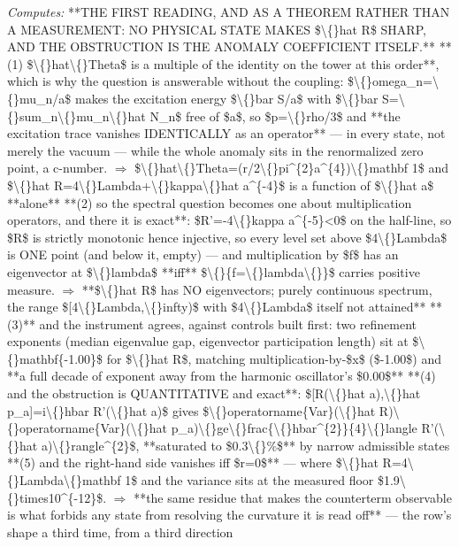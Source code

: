 \begin{description}
\emph{Computes:} **THE FIRST READING, AND AS A THEOREM RATHER THAN A MEASUREMENT: NO PHYSICAL STATE MAKES \$\textbackslash\{\}hat R\$ SHARP, AND THE OBSTRUCTION IS THE ANOMALY COEFFICIENT ITSELF.**  **(1) \$\textbackslash\{\}hat\textbackslash\{\}Theta\$ is a multiple of the identity on the tower at this order**, which is why the question is answerable without the coupling: \$\textbackslash\{\}omega\_n=\textbackslash\{\}mu\_n/a\$ makes the excitation energy \$\textbackslash\{\}bar S/a\$ with \$\textbackslash\{\}bar S=\textbackslash\{\}sum\_n\textbackslash\{\}mu\_n\textbackslash\{\}hat N\_n\$ free of \$a\$, so \$p=\textbackslash\{\}rho/3\$ and **the excitation trace vanishes IDENTICALLY as an operator** --- in every state, not merely the vacuum --- while the whole anomaly sits in the renormalized zero point, a c-number.  \ensuremath{\Rightarrow} \$\textbackslash\{\}hat\textbackslash\{\}Theta=(r/2\textbackslash\{\}pi\textasciicircum{}\{2\}a\textasciicircum{}\{4\})\textbackslash\{\}mathbf 1\$ and \$\textbackslash\{\}hat R=4\textbackslash\{\}Lambda+\textbackslash\{\}kappa\textbackslash\{\}hat a\textasciicircum{}\{-4\}\$ is a function of \$\textbackslash\{\}hat a\$ **alone**  **(2) so the spectral question becomes one about multiplication operators, and there it is exact**: \$R'=-4\textbackslash\{\}kappa a\textasciicircum{}\{-5\}<0\$ on the half-line, so \$R\$ is strictly monotonic hence injective, so every level set above \$4\textbackslash\{\}Lambda\$ is ONE point (and below it, empty) --- and multiplication by \$f\$ has an eigenvector at \$\textbackslash\{\}lambda\$ **iff** \$\textbackslash\{\}\{f=\textbackslash\{\}lambda\textbackslash\{\}\}\$ carries positive measure.  \ensuremath{\Rightarrow} **\$\textbackslash\{\}hat R\$ has NO eigenvectors; purely continuous spectrum, the range \$[4\textbackslash\{\}Lambda,\textbackslash\{\}infty)\$ with \$4\textbackslash\{\}Lambda\$ itself not attained**  **(3)** and the instrument agrees, against controls built first: two refinement exponents (median eigenvalue gap, eigenvector participation length) sit at \$\textbackslash\{\}mathbf\{-1.00\}\$ for \$\textbackslash\{\}hat R\$, matching multiplication-by-\$x\$ (\$-1.00\$) and **a full decade of exponent away from the harmonic oscillator's \$0.00\$**  **(4) and the obstruction is QUANTITATIVE and exact**: \$[R(\textbackslash\{\}hat a),\textbackslash\{\}hat p\_a]=i\textbackslash\{\}hbar R'(\textbackslash\{\}hat a)\$ gives \$\textbackslash\{\}operatorname\{Var\}(\textbackslash\{\}hat R)\textbackslash\{\}operatorname\{Var\}(\textbackslash\{\}hat p\_a)\textbackslash\{\}ge\textbackslash\{\}frac\{\textbackslash\{\}hbar\textasciicircum{}\{2\}\}\{4\}\textbackslash\{\}langle R'(\textbackslash\{\}hat a)\textbackslash\{\}rangle\textasciicircum{}\{2\}\$, **saturated to \$0.3\textbackslash\{\}\%\$** by narrow admissible states  **(5) and the right-hand side vanishes iff \$r=0\$** --- where \$\textbackslash\{\}hat R=4\textbackslash\{\}Lambda\textbackslash\{\}mathbf 1\$ and the variance sits at the measured floor \$1.9\textbackslash\{\}times10\textasciicircum{}\{-12\}\$.  \ensuremath{\Rightarrow}  **the same residue that makes the counterterm observable is what forbids any state from resolving the curvature it is read off** --- the row's shape a third time, from a third direction  
\end{description}

